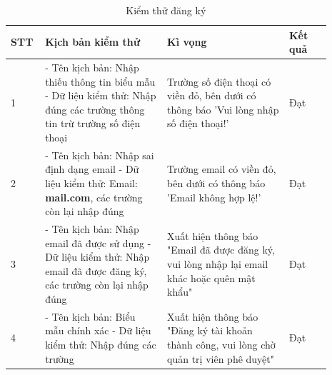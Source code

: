 \documentclass[./../main.tex]{subfiles}
\begin{document}
\begin{longtable}{| p{0.07\linewidth} | p{0.35\linewidth} | p{0.35\linewidth} | p{0.12\linewidth} |}
\caption{Kiểm thử đăng ký} \label{test-case-1}
\hline
\textbf{STT} & \textbf{Kịch bản kiểm thử} & \textbf{Kì vọng} & \textbf{Kết quả}
\\ \hline 
    \centerline{1} & 
    - Tên kịch bản: Nhập thiếu thông tin biểu mẫu\newline 
    - Dữ liệu kiểm thử: Nhập đúng các trường thông tin trừ trường số điện thoại &
    Trường số điện thoại có viền đỏ, bên dưới có thông báo 'Vui lòng nhập số điện thoại!' &
    \centerline{Đạt}
\\ \hline 
    \centerline{2} & 
    - Tên kịch bản: Nhập sai định dạng email\newline
    - Dữ liệu kiểm thử: Email: \textbf{mail.com}, các trường còn lại nhập đúng &
    Trường email có viền đỏ, bên dưới có thông báo 'Email không hợp lệ!' &
    \centerline{Đạt}
\\ \hline 
    \centerline{3} & 
    - Tên kịch bản: Nhập email đã được sử dụng \newline 
    - Dữ liệu kiểm thử: Nhập email đã được đăng ký, các trường còn lại nhập đúng &
    Xuất hiện thông báo "Email đã được đăng ký, vui lòng nhập lại email khác hoặc quên mật khẩu"  &
    \centerline{Đạt}
\\ \hline
    \centerline{4} & 
    - Tên kịch bản: Biểu mẫu chính xác \newline 
    - Dữ liệu kiểm thử: Nhập đúng các trường &
    Xuất hiện thông báo "Đăng ký tài khoản thành công, vui lòng chờ quản trị viên phê duyệt" &
    \centerline{Đạt}
\\ \hline
\end{longtable}
\end{document}
